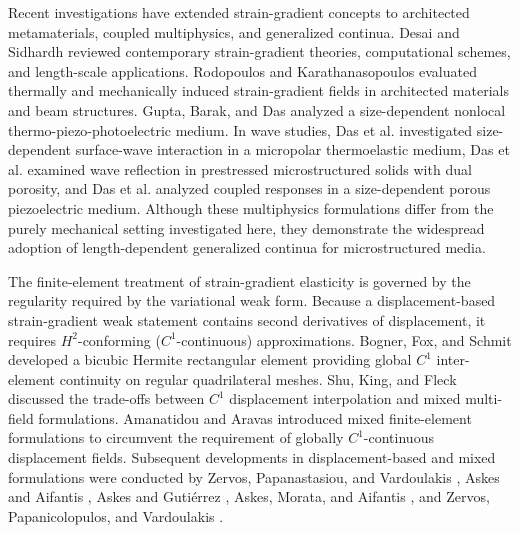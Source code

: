 \documentclass[preprint,12pt]{elsarticle}
\begin{document}
Recent investigations have extended strain-gradient concepts to
architected metamaterials, coupled multiphysics, and generalized continua.
Desai and Sidhardh \cite{DesaiSidhardh2025} reviewed contemporary
strain-gradient theories, computational schemes, and length-scale
applications. Rodopoulos and Karathanasopoulos
\cite{RodopoulosKarathanasopoulos2024} evaluated thermally and mechanically
induced strain-gradient fields in architected materials and beam
structures. Gupta, Barak, and Das \cite{GuptaBarakDas2024} analyzed a
size-dependent nonlocal thermo-piezo-photoelectric medium. In wave studies,
Das et al. \cite{DasDuttaCraciunSurBarakGupta2024} investigated
size-dependent surface-wave interaction in a micropolar thermoelastic medium,
Das et al. \cite{DasDuttaGuptaSinghalBarakAlmohsen2025} examined wave
reflection in prestressed microstructured solids with dual porosity, and
Das et al. \cite{DasSurGuptaDuttaSinghalKumar2025} analyzed coupled
responses in a size-dependent porous piezoelectric medium. Although these
multiphysics formulations differ from the purely mechanical setting
investigated here, they demonstrate the widespread adoption of
length-dependent generalized continua for microstructured media.

The finite-element treatment of strain-gradient elasticity is governed by
the regularity required by the variational weak form. Because a
displacement-based strain-gradient weak statement contains second
derivatives of displacement, it requires $H^2$-conforming
($C^1$-continuous) approximations. Bogner, Fox, and Schmit
\cite{BognerFoxSchmit1966} developed a bicubic Hermite rectangular element
providing global $C^1$ inter-element continuity on regular quadrilateral
meshes. Shu, King, and Fleck \cite{ShuKingFleck1999} discussed the
trade-offs between $C^1$ displacement interpolation and mixed
multi-field formulations. Amanatidou and Aravas \cite{AmanatidouAravas2002}
introduced mixed finite-element formulations to circumvent the requirement
of globally $C^1$-continuous displacement fields. Subsequent developments
in displacement-based and mixed formulations were conducted by Zervos,
Papanastasiou, and Vardoulakis \cite{ZervosPapanastasiouVardoulakis2001},
Askes and Aifantis \cite{AskesAifantis2006}, Askes and Guti\'errez
\cite{AskesGutierrez2006}, Askes, Morata, and Aifantis
\cite{AskesMorataAifantis2008}, and Zervos, Papanicolopulos, and
Vardoulakis \cite{ZervosPapanicolopulosVardoulakis2009}.
\end{document}
